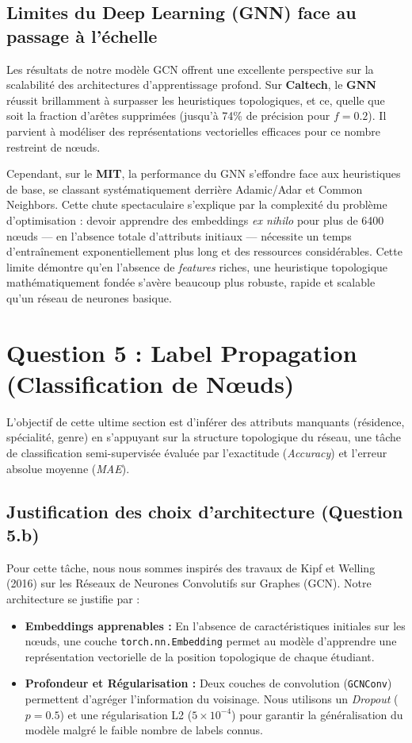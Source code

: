 \documentclass[a4paper,11pt]{article}
\begin{document}
\subsection{Limites du Deep Learning (GNN) face au passage à l'échelle}
Les résultats de notre modèle GCN offrent une excellente perspective sur la scalabilité des architectures d'apprentissage profond. Sur \textbf{Caltech}, le \textbf{GNN} réussit brillamment à surpasser les heuristiques topologiques, et ce, quelle que soit la fraction d'arêtes supprimées (jusqu'à 74\% de précision pour $f=0.2$). Il parvient à modéliser des représentations vectorielles efficaces pour ce nombre restreint de nœuds.

Cependant, sur le \textbf{MIT}, la performance du GNN s'effondre face aux heuristiques de base, se classant systématiquement derrière Adamic/Adar et Common Neighbors. Cette chute spectaculaire s'explique par la complexité du problème d'optimisation : devoir apprendre des embeddings \textit{ex nihilo} pour plus de 6400 nœuds — en l'absence totale d'attributs initiaux — nécessite un temps d'entraînement exponentiellement plus long et des ressources considérables. Cette limite démontre qu'en l'absence de \textit{features} riches, une heuristique topologique mathématiquement fondée s'avère beaucoup plus robuste, rapide et scalable qu'un réseau de neurones basique.

\section{Question 5 : Label Propagation (Classification de Nœuds)}

L'objectif de cette ultime section est d'inférer des attributs manquants (résidence, spécialité, genre) en s'appuyant sur la structure topologique du réseau, une tâche de classification semi-supervisée évaluée par l'exactitude (\textit{Accuracy}) et l'erreur absolue moyenne (\textit{MAE}).

\subsection{Justification des choix d'architecture (Question 5.b)}
Pour cette tâche, nous nous sommes inspirés des travaux de Kipf et Welling (2016) sur les Réseaux de Neurones Convolutifs sur Graphes (GCN). Notre architecture se justifie par :
\begin{itemize}
    \item \textbf{Embeddings apprenables :} En l'absence de caractéristiques initiales sur les nœuds, une couche \texttt{torch.nn.Embedding} permet au modèle d'apprendre une représentation vectorielle de la position topologique de chaque étudiant.
    \item \textbf{Profondeur et Régularisation :} Deux couches de convolution (\texttt{GCNConv}) permettent d'agréger l'information du voisinage. Nous utilisons un \textit{Dropout} ($p=0.5$) et une régularisation L2 ($5\times10^{-4}$) pour garantir la généralisation du modèle malgré le faible nombre de labels connus.
\end{itemize}
\end{document}

